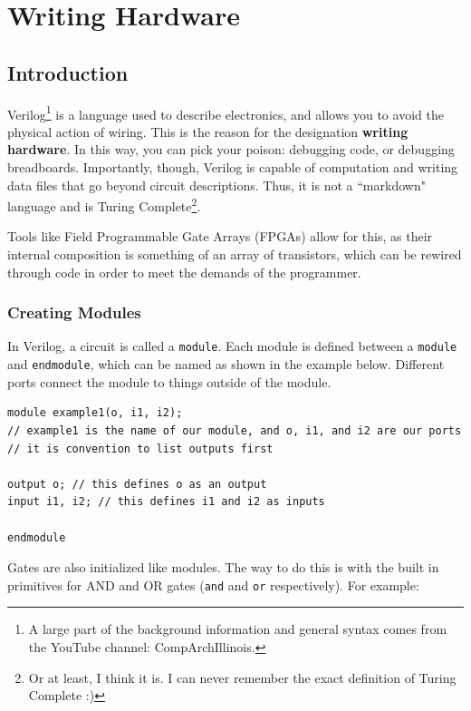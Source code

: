 \documentclass[12pt]{report}
\newcommand{\lst}{\lstinline}
\newcommand{\bs}{\bigskip}
\begin{document}
\chapter{Writing Hardware}

\section{Introduction}

Verilog\footnote{A large part of the background information and general syntax comes from the YouTube channel: CompArchIllinois.} is a language used to describe electronics, and allows you to avoid the physical action of wiring. This is the reason for the designation \textbf{writing hardware}. In this way, you can pick your poison: debugging code, or debugging breadboards. Importantly, though, Verilog is capable of computation and writing data files that go beyond circuit descriptions. Thus, it is not a ``markdown" language and is Turing Complete\footnote{Or at least, I think it is. I can never remember the exact definition of Turing Complete :)}.\newline

Tools like Field Programmable Gate Arrays (FPGAs) allow for this, as their internal composition is something of an array of transistors, which can be rewired through code in order to meet the demands of the programmer. 


\subsection{Creating Modules} In Verilog, a circuit is called a \lst{module}. Each module is defined between a \lst{module} and \lst{endmodule}, which can be named as shown in the example below. Different ports connect the module to things outside of the module.

\bs

\begin{lstlisting}
module example1(o, i1, i2); 
// example1 is the name of our module, and o, i1, and i2 are our ports 
// it is convention to list outputs first

output o; // this defines o as an output
input i1, i2; // this defines i1 and i2 as inputs

endmodule
\end{lstlisting}

\bs

Gates are also initialized like modules. The way to do this is with the built in primitives for AND and OR gates (\lst{and} and \lst{or} respectively). For example: 
\end{document}
